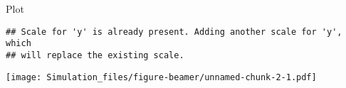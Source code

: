 \begin{frame}[fragile]{Plot}

\begin{Shaded}
\begin{Highlighting}[]
\NormalTok{(}     \NormalTok{()}
\end{Highlighting}
\end{Shaded}

\begin{verbatim}
## Scale for 'y' is already present. Adding another scale for 'y', which
## will replace the existing scale.
\end{verbatim}

\texttt{[image: Simulation\_files/figure-beamer/unnamed-chunk-2-1.pdf]}

\end{frame}
